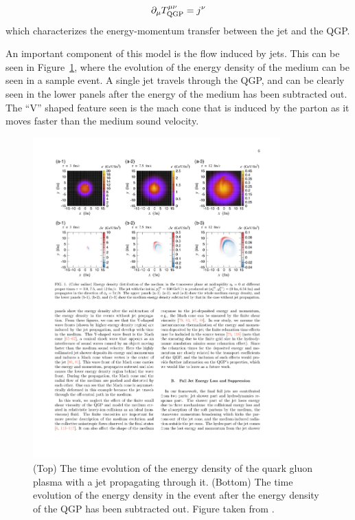 \begin{align}
 \partial_\mu T_{\rm QGP}^{\mu\nu} = j^\nu
\end{align}
which characterizes the energy-momentum transfer between the jet and the QGP.

An important component of this model is the flow induced by jets.
This can be seen in Figure~\ref{fig:jf_snapshot}, where the evolution of the energy density of the medium can be seen in a sample event.
A single jet travels through the QGP, and can be clearly seen in the lower panels after the energy of the medium has been subtracted out.
The ``V'' shaped feature seen is the mach cone that is induced by the parton as it moves faster than the medium sound velocity.


\begin{figure}[htbp]
\begin{center}
\includegraphics[width=0.85\textwidth]{figures/jetMeasurements/JF_snapshot}
\caption{(Top) The time evolution of the energy density of the quark gluon plasma with a jet propagating through it.
(Bottom) The time evolution of the energy density in the event after the energy density of the QGP has been subtracted out.
Figure taken from \cite{Tachibana:2017syd}.}
\label{fig:jf_snapshot}
\end{center}
\end{figure}

